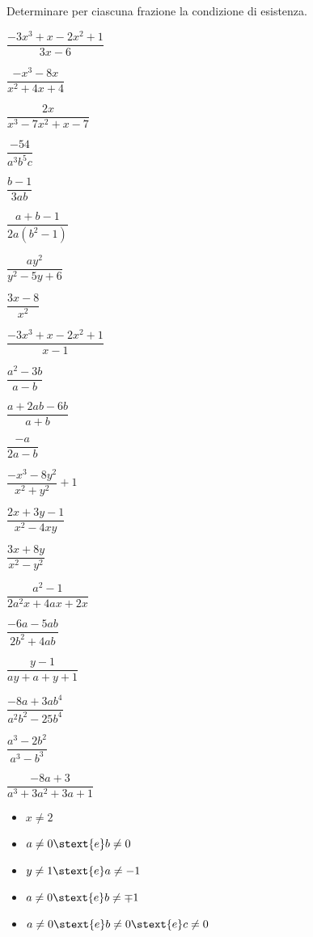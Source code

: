 \begin{esercizio}
\label{ese:19.1}
Determinare per ciascuna frazione la condizione di esistenza.
\begin{htmulticols}{3}
\begin{enumeratea}
\item \(\dfrac{-3x^{3}+x-2x^{2}+1}{3x-6}\)
\item \(\dfrac{-x^{3}-8x}{x^{2}+4x+4}\)
\item \(\dfrac{2x}{x^{3}-7x^{2}+x-7}\)
\item \(\dfrac{-54}{a^{3}b^{5}c}\)
\item \(\dfrac{b-1}{3ab}\)
\item \(\dfrac{a+b-1}{2a \left(b^{2}-1\right)}\)
\item \(\dfrac{ay^{2}}{y^{2}-5y+6}\)
\item \(\dfrac{3x-8}{x^{2}}\)
\item \(\dfrac{-3x^{3}+x-2x^{2}+1}{x-1}\)
\item \(\dfrac{a^{{2}}-3b}{a-b}\)
\item \(\dfrac{a+2ab-6b}{a+b}\)
\item \(\dfrac{-a}{2a-b}\)
\item \(\dfrac{-x^{{3}}-8y^{{2}}}{x^{{2}}+y^{{2}}}+1\)
\item \(\dfrac{2x+3y-1}{x^{2}-4xy}\)
\item \(\dfrac{3x+8y}{x^{2}-y^{2}}\)
\item \(\dfrac{a^{2}-1}{2a^{2}x+4ax+2x}\)
\item \(\dfrac{-6a-5ab}{2b^{2}+4ab}\)
\item \(\dfrac{y-1}{ay+a+y+1}\)
\item \(\dfrac{-8a+3ab^{4}}{a^{2}b^{2}-25b^{4}}\)
\item \(\dfrac{a^{3}-2b^{2}}{a^{3}-b^{3}}\)
\item \(\dfrac{-8a+3}{a^{3}+3a^{2}+3a+1}\)
\end{enumeratea}
\end{htmulticols}
\begin{htmulticols}{3}
\begin{itemize} [label={\framebox(12,12){}}]
\item \(x \neq 2\)
\item \(a \neq 0 \stext{e} b \neq 0\)
\item \(y \neq 1\stext{e} a \neq -1\)
\item \(a \neq 0 \stext{e} b \neq \mp 1\)
\item \(a \neq 0 \stext{e} b \neq 0 \stext{e} c \neq 0\)

\end{itemize}
\end{htmulticols}
\end{esercizio}
